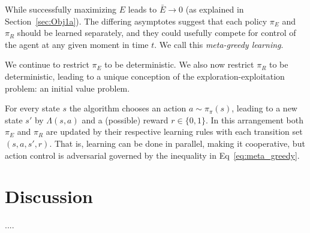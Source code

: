 \documentclass[9pt,twocolumn,twoside]{pnas-new}
\begin{document}

While successfully maximizing $E$ leads to $\bar E \rightarrow 0$ (as explained in Section~\ref{sec:Obj1a}). The differing asymptotes suggest that each policy $\pi_E$ and $\pi_R$ should be learned separately, and they could usefully compete for control of the agent at any given moment in time $t$. We call this \textit{meta-greedy learning}.

We continue to restrict $\pi_E$ to be deterministic. We also now restrict $\pi_R$ to be deterministic, leading to a unique conception of the exploration-exploitation problem: an initial value problem. 

For every state $s$ the algorithm chooses an action $a \sim \pi_{\pi}(s)$, leading to a new state $s'$ by $\Lambda(s, a)$ and a (possible) reward $r \in \{0,1\}$. In this arrangement both $\pi_E$ and $\pi_R$ are updated by their respective learning rules with each transition set $(s, a, s', r)$. That is, learning can be done in parallel, making it cooperative, but action control is adversarial governed by the inequality in Eq~\ref{eq:meta_greedy}.

\section{Discussion}
....


\end{document}
